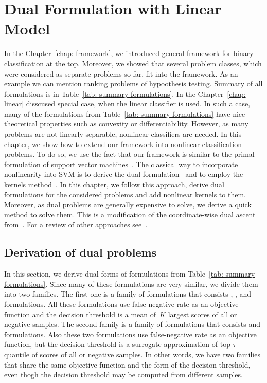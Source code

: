 \chapter{Dual Formulation with Linear Model}\label{chap: dual}

In the Chapter~\ref{chap: framework}, we introduced general framework for binary classification at the top. Moreover, we showed that several problem classes, which were considered as separate problems so far, fit into the framework. As an example we can mention ranking problems of hypoothesis testing. Summary of all formulations is in Table~\ref{tab: summary formulations}. In the Chapter~\ref{chap: linear} disscused special case, when the linear classifier is used. In such a case, many of the formulations from Table~\ref{tab: summary formulations} have nice theoretical properties such as convexity or differentiability. However, as many problems are not linearly separable, nonlinear classifiers are needed. In this chapter, we show how to extend our framework into nonlinear classification problems. To do so, we use the fact that our framework is similar to the primal formulation of support vector machines~\cite{cortes1995support}. The classical way to incorporate nonlinearity into SVM is to derive the dual formulation~\cite{boyd2004convex} and to employ the kernels method~\cite{scholkopf2001learning}. In this chapter, we follow this approach, derive dual formulations for the considered problems and add nonlinear kernels to them. Moreover, as dual problems are generally expensive to solve, we derive a quick method to solve them. This is a modification of the coordinate-wise dual ascent from~\cite{hsieh2008dual}. For a review of other approaches see~\cite{batmaz2019review,werner2019review}.

\section{Derivation of dual problems}\label{sec:Derivation of dual problems}

In this section, we derive dual forms of formulations from Table~\ref{tab: summary formulations}. Since many of these formulations are very similar, we divide them into two families. The first one is a family of \TopPushK formulations that consists \TopPush, \TopPushK, \TopMeanK and \tauFPL formulations. All these formulations use false-negative rate as an objective function and the decision threshold is a mean of~$K$ largest scores of all or negative samples. The second family is a family of \PatMat formulations that consists \PatMat and \PatMat formulations. Also these two formulations use false-negative rate as an objective function, but the decision threshold is a surrogate approximation of top $\tau$-quantile of scores of all or negative samples. In other words, we have two families that share the same objective function and the form of the decision threshold, even thogh the decision threshold may be computed from different samples.  



